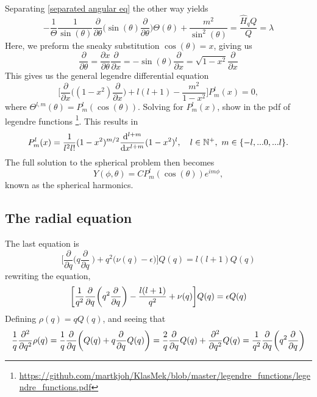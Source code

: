 \documentclass{article}
\begin{document}
        Separating \eqref{separated angular eq} the other way yields
        \begin{equation*}
            - \frac{1}{\Theta}\frac{1}{\sin(\theta)}\frac{\partial}{\partial \theta}\bigg( \sin(\theta)\frac{\partial}{\partial \theta}\bigg) \Theta(\theta) + \frac{m^2}{\sin^2(\theta)} = \frac{\hat H_q Q}{Q} = \lambda
        \end{equation*}
        Here, we preform the sneaky substitution \(\cos(\theta) = x\), giving us
        \begin{equation*}
            \frac{\partial}{\partial \theta} = \frac{\partial x}{\partial \theta} \frac{\partial}{\partial x} = -\sin(\theta) \frac{\partial}{\partial x} = \sqrt{1 - x^2} \frac{\partial}{\partial x}
        \end{equation*}
        This gives us the general legendre differential equation
        \begin{equation}
            \label{Legendre equation}
            \bigg[\frac{\partial}{\partial x} \bigg( (1 - x^2) \frac{\partial}{\partial x} \bigg)+ l(l + 1)  - \frac{m^2}{1 - x^2} \bigg] P^l_m(x) = 0,
        \end{equation}
        where \(\Theta^{l,m}(\theta) = P^l_m(\cos(\theta))\). Solving for \(P^l_m(x)\), show in the pdf of legendre functions \footnote[1]{\url{https://github.com/martkjoh/KlasMek/blob/master/legendre_functions/legendre_functions.pdf}}. This results in 
        \begin{equation*}
            P^l_m(x) = \frac{1}{l^2 l!}(1 - x^2)^{{m}/{2}} \d[x]{l + m} (1 - x^2)^l, \quad l \in\mathbb{N^+}, \,\, m\in \{-l, ... 0, ... l\}.
        \end{equation*}
        The full solution to the spherical problem then becomes
        \begin{equation*}
            Y(\phi, \theta) = CP^l_m(\cos(\theta))e^{im\phi},
        \end{equation*}
        known as the spherical harmonics.
        
    \subsection*{The radial equation}

        The last equation is
        \begin{equation*}
            \bigg[\frac{\partial}{\partial q}\bigg(q \frac{\partial}{\partial q}\ \bigg) + q^2 \big(\nu(q) - \epsilon \big) \bigg] Q(q) = l(l + 1)Q(q)
        \end{equation*}
        rewriting the equation,
        \begin{equation*}
            \bigg[ \frac{1}{q^2} \del[q] \bigg( q^2 \del[q] \bigg) - \frac{l(l + 1)}{q^2} + \nu(q) \bigg] Q(q) = \epsilon Q(q)
        \end{equation*}
        Defining \(\rho(q) = qQ(q)\), and seeing that
        \begin{equation*}
            \frac{1}{q} \del[q]2 \rho(q) = \frac{1}{q} \del[q] \bigg(Q(q) + q \del[q] Q(q) \bigg) = \frac{2}{q} \del[q] Q(q) + \del[q]2 Q(q) = \frac{1}{q^2} \del[q] \bigg( q^2 \del[q] \bigg)
        \end{equation*}
\end{document}

